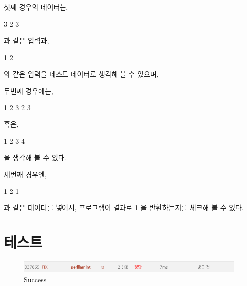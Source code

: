 \documentclass {article}
\begin{document}
첫째 경우의 데이터는,

3\newline
{}\newline
{} 2 3\newline

과 같은 입력과,

1\newline
{}\newline
{} 2\newline

와 같은 입력을 테스트 데이터로 생각해 볼 수 있으며,

두번째 경우에는,

1\newline
{}\newline
{} 2 3\newline
{}
 2 3\newline

혹은,

1\newline
{}\newline
{} 2 3 4\newline

을 생각해 볼 수 있다.

세번째 경우엔,

1\newline
{}\newline
{} 2 1\newline

과 같은 데이터를 넣어서, 프로그램이 결과로 1 을 반환하는지를 체크해 볼 수 있다.
\section {테스트}

\begin {figure}[h]
  \centering
  \includegraphics [width=120mm]{success.png}
  \caption {Success}
  \label{fig:Success}
\end {figure}
\end{document}
